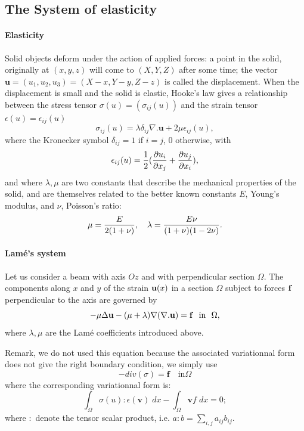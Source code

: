 \documentclass[a4paper,twoside,12pt]{book}
\def\p{\partial}
\begin{document}
\subsection{The System of elasticity}

\paragraph{Elasticity}

Solid objects deform under the action of applied forces:
a point in the solid, originally at $(x,y,z)$ will come to $(X,Y,Z)$
after some time; the vector $\mathbf{u}=(u_1,u_2,u_3) = (X-x, Y-y, Z-z)$ is called
the displacement. When the displacement is small and the solid is
elastic, Hooke's law gives a relationship between the stress tensor
$\sigma(u)=(\sigma_{ij}(u) )$ and the strain tensor $\epsilon(u)=\epsilon_{ij}(u)$
$$
\sigma_{ij}(u) = \lambda \delta_{ij} \nabla.\mathbf{u}+ 2\mu\epsilon_{ij}(u),
$$
where the Kronecker symbol $\delta_{ij} = 1$ if $i=j$, $0$ otherwise, with
$$\epsilon_{ij}(u) = {1\over 2}({\p u_i\over\p x_j} +
{\p u_j\over\p x_i} ),
$$
and where $\lambda, \mu$ are two constants that describe the
mechanical properties of the solid, and are themselves related to the
better known constants $E$, Young's modulus, and $\nu$, Poisson's ratio:
$$ \mu = {E\over 2( 1+\nu)}, \quad \lambda = {E\nu\over (1+\nu)(1-2\nu)}.
$$


 \paragraph{Lam\'e's system}

Let us consider a beam with axis $Oz$ and with perpendicular section
$\Omega$. The components along $x$ and $y$ of the strain ${\bf u}(x)$
in a section $\Omega$ subject to forces ${\bf f}$ perpendicular to the
axis are governed by \\
$$
  -\mu \Delta {\bf u} - (\mu+\lambda)  \nabla (\nabla .{\bf u})={\bf f}~~\hbox{in}~~\Omega,
$$
where $\lambda ,\mu  $ are the Lam\'{e} coefficients introduced above.

Remark, we do not used this equation because the associated  variationnal
form does not give the right boundary condition, we simply use
$$
  - div( \sigma ) = \mathbf{f}  \quad  \mbox{in} \Omega
$$
where the corresponding variationnal form is:
$$
 \int_{\Omega} \sigma(u) : \epsilon(\mathbf{v})\;dx - \int_{\Omega}  \mathbf{v} f \;dx =0;
$$
where $:$  denote the tensor scalar product,   i.e. $ a: b = \sum_{i,j}  a_{ij}b_{ij}$.
\end{document}
